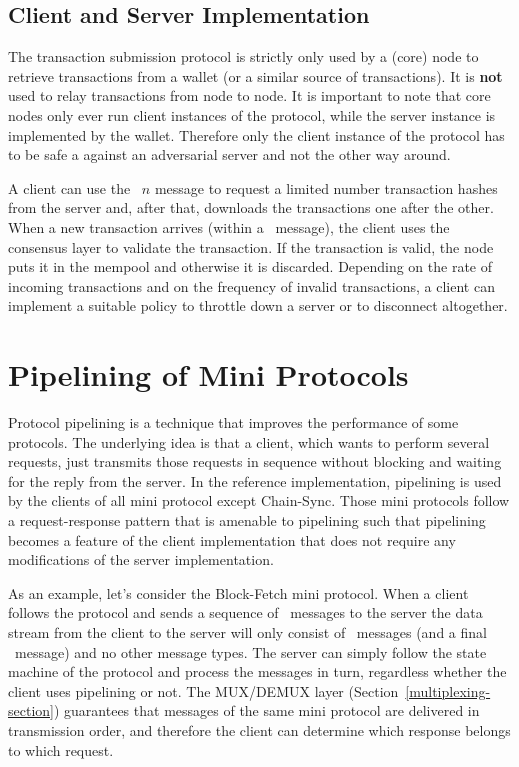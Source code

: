 \documentclass{report}
\theoremstyle{definition}{
  \newtheorem{lemma}{Lemma}[section] %
  \newtheorem{definition}[lemma]{Definition}
}
\theoremstyle{theorem}{
  \newtheorem{invariant}[lemma]{Invariant}
  \newtheorem{proofobligation}[lemma]{Proof Obligation}
}
\numberwithin{equation}{lemma}
\begin{document}
\subsection{Client and Server Implementation}
The transaction submission protocol is strictly only used
by a (core) node to retrieve transactions from a wallet (or a similar source of transactions).
It is {\bf not} used to relay transactions from node to node.
It is important to note that core nodes only ever run client instances of the protocol,
while the server instance is implemented by the wallet.
Therefore only the client instance of the protocol has to be safe a against an adversarial server
and not the other way around.

A client can use the \GetHashes~$n$ message to request a limited number transaction hashes from the server
and, after that, downloads the transactions one after the other.
When a new transaction arrives (within a \Tx~message), the client uses the consensus layer to
validate the transaction.
If the transaction is valid, the node puts it in the mempool and otherwise it is discarded.
Depending on the rate of incoming transactions and on the frequency of invalid transactions,
a client can implement a suitable policy to throttle down a server or to disconnect altogether.

\section{Pipelining of Mini Protocols}
\label{pipelining}
Protocol pipelining is a technique that improves the performance of some protocols.
The underlying idea is that a client, which wants to perform several requests,
just transmits those requests in sequence without blocking and waiting for the reply from the server.
In the reference implementation, pipelining is used by the clients of all mini protocol except Chain-Sync.
Those mini protocols follow a request-response pattern that is amenable to pipelining such
that pipelining becomes a feature of the client implementation that does not require any
modifications of the server implementation.

As an example, let's consider the Block-Fetch mini protocol.
When a client follows the protocol and sends a sequence of \RequestRange~messages to the server
the data stream from the client to the server will only consist of \RequestRange~messages
(and a final \ClientDone~message) and no other message types.
The server can simply follow the state machine of the protocol and process the messages in turn,
regardless whether the client uses pipelining or not.
The MUX/DEMUX layer (Section~\ref{multiplexing-section}) guarantees
that messages of the same mini protocol are delivered in transmission order,
and therefore the client can determine which response belongs to which request.
\end{document}
